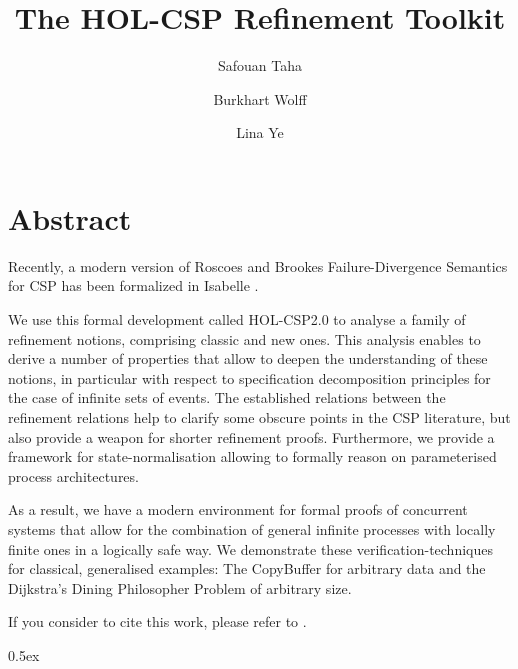 \documentclass[11pt,a4paper]{book}
\begin{document}
\title{The HOL-CSP Refinement Toolkit}
\author{ Safouan Taha \and Burkhart Wolff \and Lina Ye }
\maketitle
\chapter*{Abstract}

   Recently, a modern version of Roscoes and Brookes \cite{brookes-roscoe85} 
   Failure-Divergence Semantics for CSP has been formalized in Isabelle \cite{HOL-CSP-AFP}. 
   
   We use  this formal development called HOL-CSP2.0 to analyse a family of refinement 
   notions, comprising classic and new ones. 
   This analysis enables to derive a number of properties that allow to deepen the 
   understanding of these notions, in particular with respect to specification 
   decomposition principles for the case of infinite sets of events. The established 
   relations between the refinement relations help to clarify some obscure points in the 
   CSP literature, but also provide a weapon for shorter refinement proofs. Furthermore, 
   we provide a framework for state-normalisation allowing to formally reason on 
   parameterised process architectures.
   
   As a result, we have a modern environment for formal proofs of concurrent systems that 
   allow for the combination of general infinite processes with locally finite ones in a 
   logically safe way.  We demonstrate these verification-techniques for classical, 
   generalised examples: The CopyBuffer for arbitrary data and the Dijkstra's Dining 
   Philosopher Problem of arbitrary size.
   
   If you consider to cite this work, please refer to \cite{HOL-CSP-iFM2020}.
 
\tableofcontents

\parindent 0pt\parskip 0.5ex





\end{document}
